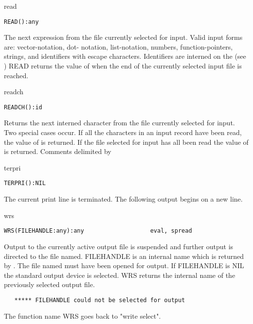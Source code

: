 \begin{Function}{read}
\begin{verbatim}
READ():any
\end{verbatim}
   The  next  expression  from the  file  currently  selected for
   input.     Valid  input  forms  are:    vector-notation,  dot-
   notation,  list-notation, numbers, function-pointers, strings,
   and  identifiers  with  escape characters.     Identifiers are
   interned   on  the     (see  )
   READ  returns the
   value  of  when the end of the currently selected input
   file is reached.


\end{Function}
\begin{Function}{readch}
\begin{verbatim}
READCH():id
\end{verbatim}
   Returns  the next  interned character from  the file currently
   selected  for input.   Two  special cases occur.    If all the
   characters  in an  input record have  been read,  the value of
     is  returned.   If  the file  selected for  input has
   all  been read  the value  of   is returned.   Comments
   delimited by %


\end{Function}
\begin{Function}{terpri}
\begin{verbatim}
TERPRI():NIL
\end{verbatim}
   The current print line is terminated. The following output
   begins on a new line.

\end{Function}
\begin{Function}{wrs}
\begin{verbatim}
WRS(FILEHANDLE:any):any                   eval, spread
\end{verbatim}
   Output  to the currently  active output file  is suspended and
   further  output is directed to the  file named.  FILEHANDLE is
   an  internal name  which is returned  by . The file named
   must  have been opened for  output.  If  FILEHANDLE is NIL the
   standard  output device is selected.  WRS returns the internal
   name of the previously selected output file.
\begin{verbatim}
   ***** FILEHANDLE could not be selected for output
\end{verbatim}
The function name WRS goes back to "write select".
\end{Function}


